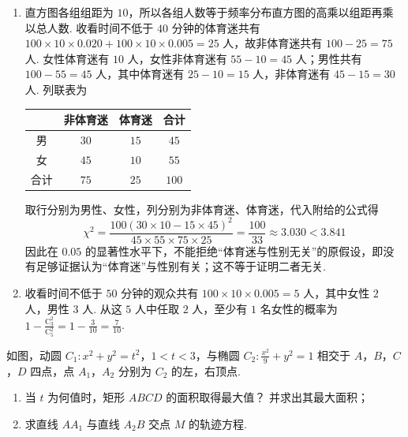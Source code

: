 \begin{solution}
\begin{enumerate}
\item 直方图各组组距为 \(10\)，所以各组人数等于频率分布直方图的高乘以组距再乘以总人数. 收看时间不低于 \(40\) 分钟的体育迷共有 \(100\times10\times0.020+100\times10\times0.005=25\) 人，故非体育迷共有 \(100-25=75\) 人. 女性体育迷有 \(10\) 人，女性非体育迷有 \(55-10=45\) 人；男性共有 \(100-55=45\) 人，其中体育迷有 \(25-10=15\) 人，非体育迷有 \(45-15=30\) 人. 列联表为

\begin{center}
\begin{tabular}{|c|c|c|c|}
\hline
 & 非体育迷 & 体育迷 & 合计 \\ \hline
男 & \(30\) & \(15\) & \(45\) \\ \hline
女 & \(45\) & \(10\) & \(55\) \\ \hline
合计 & \(75\) & \(25\) & \(100\) \\ \hline
\end{tabular}
\end{center}

取行分别为男性、女性，列分别为非体育迷、体育迷，代入附给的公式得
\[
\chi^2=\frac{100\left(30\times10-15\times45\right)^2}{45\times55\times75\times25}=\frac{100}{33}\approx3.030<3.841
\]
因此在 \(0.05\) 的显著性水平下，不能拒绝“体育迷与性别无关”的原假设，即没有足够证据认为“体育迷”与性别有关；这不等于证明二者无关.
\item 收看时间不低于 \(50\) 分钟的观众共有 \(100\times10\times0.005=5\) 人，其中女性 \(2\) 人，男性 \(3\) 人. 从这 \(5\) 人中任取 \(2\) 人，至少有 \(1\) 名女性的概率为
\(\displaystyle1-\frac{\mathrm C_3^2}{\mathrm C_5^2}=1-\frac{3}{10}=\frac{7}{10}\).
\end{enumerate}
\end{solution}

\begin{problem}
如图，动圆 \(C_1: x^2 + y^2 = t^2\)，\(1 < t < 3\)，与椭圆 \(C_2: \frac{x^2}{9} + y^2 = 1\) 相交于 \(A\)，\(B\)，\(C\)，\(D\) 四点，点 \(A_1\)，\(A_2\) 分别为 \(C_2\) 的左，右顶点.
\begin{enumerate}
\item 当 \(t\) 为何值时，矩形 \(ABCD\) 的面积取得最大值？ 并求出其最大面积；
\item 求直线 \(AA_1\) 与直线 \(A_2B\) 交点 \(M\) 的轨迹方程.
\end{enumerate}

\end{problem}

